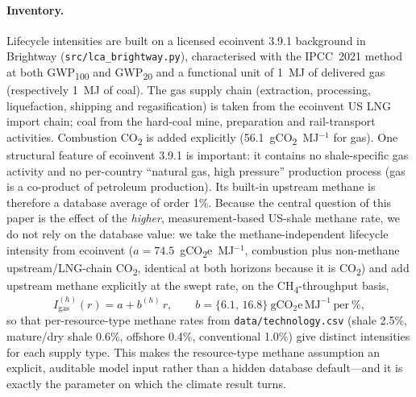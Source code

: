 \documentclass[11pt]{article}
\begin{document}
\paragraph{Inventory.} Lifecycle intensities are built on a licensed ecoinvent
3.9.1 background in Brightway (\texttt{src/lca\_brightway.py}), characterised
with the IPCC~2021 method at both GWP\textsubscript{100} and GWP\textsubscript{20}
and a functional unit of 1~MJ of delivered gas (respectively 1~MJ of coal). The
gas supply chain (extraction, processing, liquefaction, shipping and
regasification) is taken from the ecoinvent US LNG import chain; coal from the
hard-coal mine, preparation and rail-transport activities. Combustion
CO\textsubscript{2} is added explicitly (56.1~gCO\textsubscript{2}~MJ$^{-1}$ for
gas). One structural feature of ecoinvent 3.9.1 is important: it contains no
shale-specific gas activity and no per-country ``natural gas, high pressure''
production process (gas is a co-product of petroleum production). Its built-in
upstream methane is therefore a database average of order 1\%. Because the
central question of this paper is the effect of the \emph{higher},
measurement-based US-shale methane rate, we do not rely on the database value:
we take the methane-independent lifecycle intensity from ecoinvent
($a=74.5$~gCO\textsubscript{2}e~MJ$^{-1}$, combustion plus non-methane
upstream/LNG-chain CO\textsubscript{2}, identical at both horizons because it is
CO\textsubscript{2}) and add upstream methane explicitly at the swept rate,
on the CH\textsubscript{4}-throughput basis,
\begin{equation}
I_{\mathrm{gas}}^{(h)}(r) = a + b^{(h)}\, r, \qquad
b = \{6.1,\,16.8\}\ \mathrm{gCO_2e\,MJ^{-1}\,per\ \%},
\end{equation}
so that per-resource-type methane rates from \texttt{data/technology.csv}
(shale 2.5\%, mature/dry shale 0.6\%, offshore 0.4\%, conventional 1.0\%) give
distinct intensities for each supply type. This makes the resource-type methane
assumption an explicit, auditable model input rather than a hidden database
default---and it is exactly the parameter on which the climate result turns.
\end{document}
